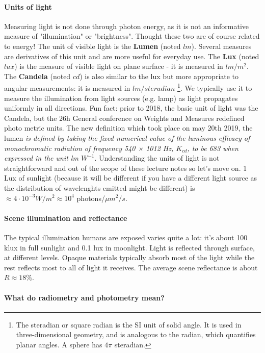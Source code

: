 \paragraph{Units of light} Measuring light is not done through photon energy, as it is not an informative measure of "illumination" or "brightness". Thought these two are of course related to energy! 
The unit of visible light is the \textbf{Lumen} (noted $lm$). Several measures are derivatives of this unit and are more useful for everyday use. The \textbf{Lux} (noted $lux$) is the measure of visible light on plane surface - it is measured in $lm/m^2$. The \textbf{Candela} (noted $cd$) is also similar to the lux but more appropriate to angular measurements:  it is measured in $lm/steradian$ \footnote{The steradian or square radian is the SI unit of solid angle. It is used in three-dimensional geometry, and is analogous to the radian, which quantifies planar angles. A sphere has $4\pi$ steradian.}. We typically use it to measure the illumination from light sources (e.g. lamp) as light propagates uniformly in all directions. Fun fact: prior to 2018, the basic unit of light was the Candela, but the 26h General conference on Weights and Measures redefined photo metric units. The new definition which took place on may 20th 2019, the lumen \textit{is defined by taking the fixed numerical value of the luminous efficacy of monochromatic radiation of frequency 540 × 1012 Hz, $K_{cd}$, to be 683 when expressed in the unit lm $W^{-1}$}. Understanding the units of light is not straightforward and out of the scope of these lecture notes so let's move on. 
1 Lux of sunlight (because it will be different if you have a different light source as the distribution of wavelenghts emitted might be different) is $\approx 4 \cdot 10^{-3} W/m^2 \approx 10^4$ photons/$ \mu m^2 /s$.

\paragraph{Scene illumination and reflectance}
The typical illumination humans are exposed varies quite a lot: it's about 100 klux in full sunlight and 0.1 lux in moonlight. Light is reflected through surface, at different levels. Opaque materials typically absorb most of the light while the rest reflects most to all of light it receives. The average scene reflectance is about $R \approx 18\% $. 

\paragraph{What do radiometry and photometry mean?} 

